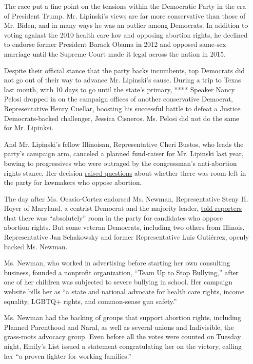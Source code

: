 The race put a fine point on the tensions within the Democratic Party in
the era of President Trump. Mr. Lipinski's views are far more
conservative than those of Mr. Biden, and in many ways he was an outlier
among Democrats. In addition to voting against the 2010 health care law
and opposing abortion rights, he declined to endorse former President
Barack Obama in 2012 and opposed same-sex marriage until the Supreme
Court made it legal across the nation in 2015.

Despite their official stance that the party backs incumbents, top
Democrats did not go out of their way to advance Mr. Lipinski's cause.
During a trip to Texas last month, with 10 days to go until the state's
primary, **** Speaker Nancy Pelosi dropped in on the campaign offices of
another conservative Democrat, Representative Henry Cuellar, boosting
his successful battle to defeat a Justice Democrats-backed challenger,
Jessica Cisneros. Ms. Pelosi did not do the same for Mr. Lipinksi.

And Mr. Lipinski's fellow Illinoisan, Representative Cheri Bustos, who
leads the party's campaign arm, canceled a planned fund-raiser for Mr.
Lipinski last year, bowing to progressives who were outraged by the
congressman's anti-abortion rights stance. Her decision
\href{https://www.nytimes.com/2019/05/22/us/politics/dan-lipinski-abortion-cheri-bustos.html}{raised
questions} about whether there was room left in the party for lawmakers
who oppose abortion.

The day after Ms. Ocasio-Cortez endorsed Ms. Newman, Representative
Steny H. Hoyer of Maryland, a centrist Democrat and the majority leader,
\href{https://thehill.com/homenews/house/461972-dem-leader-says-party-can-include-abortion-opponents}{told
reporters} that there was ``absolutely'' room in the party for
candidates who oppose abortion rights. But some veteran Democrats,
including two others from Illinois, Representative Jan Schakowsky and
former Representative Luis Gutiérrez, openly backed Ms. Newman.

Ms. Newman, who worked in advertising before starting her own consulting
business, founded a nonprofit organization, ``Team Up to Stop
Bullying,'' after one of her children was subjected to severe bullying
in school. Her campaign website bills her as ``a state and national
advocate for health care rights, income equality, LGBTQ+ rights, and
common-sense gun safety.''

Ms. Newman had the backing of groups that support abortion rights,
including Planned Parenthood and Naral, as well as several unions and
Indivisible, the grass-roots advocacy group. Even before all the votes
were counted on Tuesday night, Emily's List issued a statement
congratulating her on the victory, calling her ``a proven fighter for
working families.''

